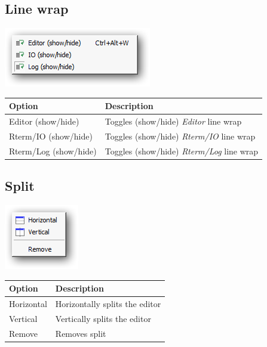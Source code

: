 \hypertarget{menu_view_linewrap}{}
\subsection{Line wrap}

\includegraphics[scale=0.50]{./res/menu_view_linewrap.png}\\

\begin{scriptsize}\begin{tabularx}{\textwidth}{>{\hsize=0.3\hsize}X>{\hsize=0.7\hsize}X}\\
    \hline
    \textbf{Option} & \textbf{Description} \\
    \hline
    Editor (show/hide) & Toggles (show/hide) \textit{Editor} line wrap \\
    Rterm/IO (show/hide) & Toggles (show/hide) \textit{Rterm/IO} line wrap \\
    Rterm/Log (show/hide) & Toggles (show/hide) \textit{Rterm/Log} line wrap \\
    \hline
  \end{tabularx}\end{scriptsize}


\hypertarget{menu_view_split}{}
\subsection{Split}

\includegraphics[scale=0.50]{./res/menu_view_split.png}\\

\begin{scriptsize}\begin{tabularx}{\textwidth}{>{\hsize=0.3\hsize}X>{\hsize=0.7\hsize}X}\\
    \hline
    \textbf{Option} & \textbf{Description} \\
    \hline
    Horizontal & Horizontally splits the editor \\
    Vertical & Vertically splits the editor \\
    Remove & Removes split \\
    \hline
  \end{tabularx}\end{scriptsize}


